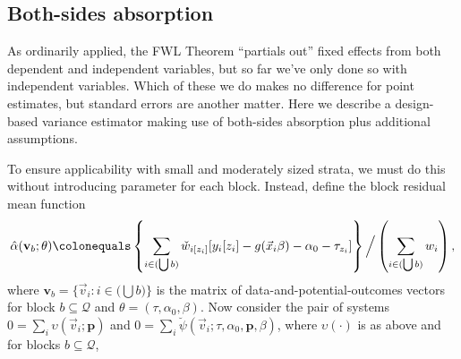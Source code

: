 \documentclass{article}
\newcommand{\defeq}{\ensuremath{\colonequals}}
\newcommand{\owt}[1][{[z_{i}]}]{\ensuremath{\check{w}_{i#1}}}
\newcommand{\absorbInterceptsEF}{\upsilon}
\begin{document}
\subsection{Both-sides absorption} \label{sec:both-sides-absorpt}

As ordinarily applied, the FWL Theorem ``partials out'' fixed effects
from both dependent and independent variables, but so far we've only
done so with independent variables.  Which of these we do makes no
difference for point estimates, but standard errors are another
matter.  Here we describe a design-based variance estimator making use
of both-sides absorption plus additional assumptions.

To ensure
applicability with small and moderately sized strata, we must do this without
introducing parameter for each block. Instead, define the
block residual mean function
\begin{equation*}
  \hat{\alpha}(\mathbf{v}_{b}; \theta) \defeq \left\{\sum_{i \in
    (\bigcup b)}\owt{} [y_{i}[z_{i}] - g(\vec{x}_{i}\beta) -
  \alpha_{0} - \tau_{z_{i}}]\right\}\Big/ \left(\sum_{i \in (\bigcup b)}w_{i}\right),
\end{equation*}
where $\mathbf{v}_{b} = \Big\{\vec{v}_{i} : i \in \big(\bigcup b \big)\Big\}$ is the matrix of
data-and-potential-outcomes vectors for block $b \subseteq \mathcal{Q}$ and $\theta = (\tau, \alpha_{0}, \beta)$.  Now consider the pair
of systems $0 = \sum_{i}\absorbInterceptsEF(\vec{v}_{i}; \mathbf{p})$
and
$0= \sum_{i}\breve{\psi}(\vec{v}_{i}; \tau, \alpha_{0}, \mathbf{p},
\beta)$, where $\absorbInterceptsEF(\cdot)$ is as above and for blocks
$b \subseteq \mathcal{Q}$,
\end{document}

